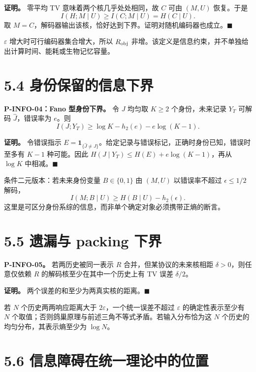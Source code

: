 \documentclass[
  11pt,
  oneside]{book}
\begin{document}
\textbf{证明。} 零平均 TV 意味着两个核几乎处处相同，故 \(C\) 可由 \((M,U)\) 恢复。于是 \[I(H;M\mid U)\ge I(C;M\mid U)=H(C\mid U).\] 取 \(M=C\)，解码器输出该核，恰好达到下界。证明对随机编码器也成立。\(\blacksquare\)

\(\varepsilon\) 增大时可行编码器集合增大，所以 \(R_{\rm obj}\) 非增。该定义是信息约束，并不单独给出计算时间、能耗或生物记忆容量。

\section{5.4 身份保留的信息下界}\label{ux8eabux4efdux4fddux7559ux7684ux4fe1ux606fux4e0bux754c}

\hypertarget{p-info-04}{}\label{p-info-04}

\textbf{P-INFO-04：Fano 型身份下界。} 令 \(J\) 均匀取 \(K\ge2\) 个身份，未来记录 \(Y_T\) 可解码 \(\widehat J\)，错误率为 \(e\)。则 \[I(J;Y_T)\ge\log K-h_2(e)-e\log(K-1).\]

\textbf{证明。} 令错误指示 \(E=\mathbf1_{\{\widehat J\ne J\}}\)。给定记录与错误标记，正确时身份已知，错误时至多有 \(K-1\) 种可能。因此 \(H(J\mid Y_T)\le H(E)+e\log(K-1)\)，再从 \(\log K\) 中相减。\(\blacksquare\)

条件二元版本：若未来身份变量 \(B\in\{0,1\}\) 由 \((M,U)\) 以错误率不超过 \(\epsilon\le1/2\) 解码， \[I(M;B\mid U)\ge H(B\mid U)-h_2(\epsilon).\] 这里是可区分身份系综的信息，而非单个确定对象必须携带正熵的断言。

\section{5.5 遗漏与 packing 下界}\label{ux9057ux6f0fux4e0e-packing-ux4e0bux754c}

\hypertarget{p-info-05}{}\label{p-info-05}

\textbf{P-INFO-05。} 若两历史被同一表示 \(R\) 合并，但某协议的未来核相距 \(\delta>0\)，则任意仅依赖 \(R\) 的解码核至少在其中一个历史上有 TV 误差 \(\delta/2\)。

\textbf{证明。} 两个误差的和至少为两真实核的距离。\(\blacksquare\)

若 \(N\) 个历史两两响应距离大于 \(2\varepsilon\)，一个统一误差不超过 \(\varepsilon\) 的确定性表示至少有 \(N\) 个取值；否则鸽巢原理与前述三角不等式矛盾。若输入分布恰为这 \(N\) 个历史的均匀分布，其表示熵至少为 \(\log N\)。

\section{5.6 信息障碍在统一理论中的位置}\label{ux4fe1ux606fux969cux788dux5728ux7edfux4e00ux7406ux8bbaux4e2dux7684ux4f4dux7f6e}
\end{document}

